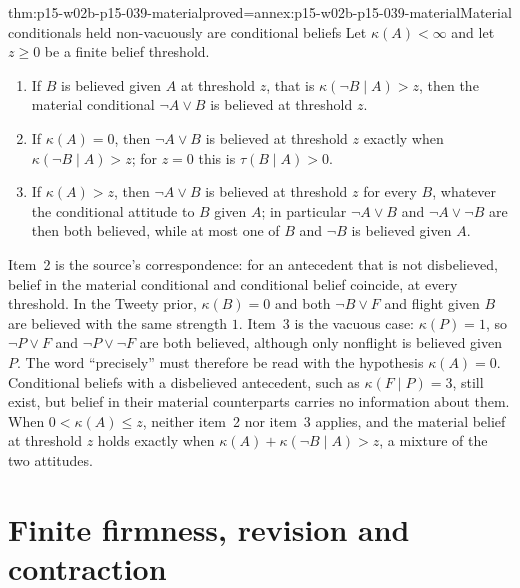 \begin{hbtheorem}{thm:p15-w02b-p15-039-material}{proved=annex:p15-w02b-p15-039-material}{Material conditionals held non-vacuously are conditional beliefs}
Let \(\kappa(A)<\infty\) and let \(z\geq0\) be a finite belief threshold.
\begin{enumerate}
\item If \(B\) is believed given \(A\) at threshold \(z\), that is
 \(\kappa(\neg B\mid A)>z\), then the material conditional
 \(\neg A\lor B\) is believed at threshold \(z\).
\item If \(\kappa(A)=0\), then \(\neg A\lor B\) is believed at threshold
 \(z\) exactly when \(\kappa(\neg B\mid A)>z\); for \(z=0\) this is
 \(\tau(B\mid A)>0\).
\item If \(\kappa(A)>z\), then \(\neg A\lor B\) is believed at threshold
 \(z\) for every \(B\), whatever the conditional attitude to \(B\) given
 \(A\); in particular \(\neg A\lor B\) and \(\neg A\lor\neg B\) are then
 both believed, while at most one of \(B\) and \(\neg B\) is believed
 given \(A\).
\end{enumerate}
\end{hbtheorem}

Item~2 is the source's correspondence: for an antecedent that is not
disbelieved, belief in the material conditional and conditional belief
coincide, at every threshold.  In the Tweety prior, \(\kappa(B)=0\) and both
\(\neg B\lor F\) and flight given \(B\) are believed with the same strength
\(1\).  Item~3 is the vacuous case: \(\kappa(P)=1\), so \(\neg P\lor F\)
and \(\neg P\lor\neg F\) are both believed, although only nonflight is
believed given \(P\).  The word ``precisely'' must therefore be read with
the hypothesis \(\kappa(A)=0\).  Conditional beliefs with a disbelieved
antecedent, such as \(\kappa(F\mid P)=3\), still exist, but belief in their
material counterparts carries no information about them.  When
\(0<\kappa(A)\leq z\), neither item~2 nor item~3 applies, and the material
belief at threshold \(z\) holds exactly when
\(\kappa(A)+\kappa(\neg B\mid A)>z\), a mixture of the two attitudes.

\section{Finite firmness, revision and contraction}


